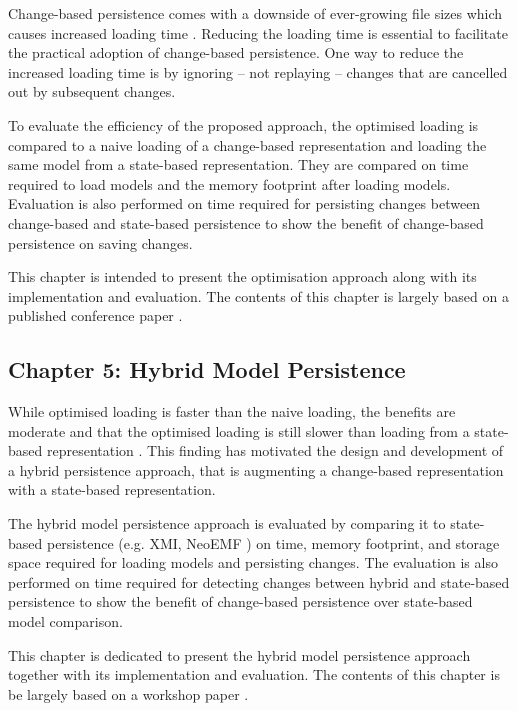 Change-based persistence comes with a downside of ever-growing file sizes \cite{DBLP:journals/entcs/RobbesL07,DBLP:conf/edoc/KoegelHLHD10} which causes increased loading time \cite{mens2002state}. Reducing the loading time is essential to facilitate the practical adoption of change-based persistence. One way to reduce the increased loading time is by ignoring -- not replaying -- changes that are cancelled out by subsequent changes. 

To evaluate the efficiency of the proposed approach, the optimised loading is compared to a naive loading of a change-based representation and loading the same model from a state-based representation. They are compared on time required to load models and the memory footprint after loading models. Evaluation is also performed on time required for persisting changes between change-based and state-based persistence to show the benefit of change-based persistence on saving changes. 

This chapter is intended to present the optimisation approach along with its implementation and evaluation. The contents of this chapter is largely based on a published conference paper \cite{yohannis2018towards}. 

\subsection{Chapter 5: Hybrid Model Persistence}
\label{sec:chapter_5_hybrid_model_persistence}
While optimised loading is faster than the naive loading, the benefits are moderate and that the optimised loading is still slower than loading from a state-based representation \cite{DBLP:conf/models/YohannisRPK18}. This finding has motivated the design and development of a hybrid persistence approach, that is augmenting a change-based representation with a state-based representation. 

The hybrid model persistence approach is evaluated by comparing it to state-based persistence (e.g. XMI, NeoEMF \cite{daniel2016neoemf}) on time, memory footprint, and storage space required for loading models and persisting changes. The evaluation is also performed on time required for detecting changes between hybrid and state-based persistence to show the benefit of change-based persistence over state-based model comparison. 

This chapter is dedicated to present the hybrid model persistence approach together with its implementation and evaluation. The contents of this chapter is be largely based on a workshop paper \cite{DBLP:conf/models/YohannisRPK18}.

